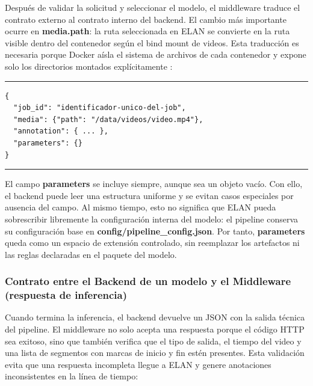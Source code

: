 \documentclass[11pt,a4paper]{article}
\begin{document}
Después de validar la solicitud y seleccionar el modelo, el middleware traduce el contrato externo al contrato interno del backend. El cambio más importante ocurre en \textbf{media.path}: la ruta seleccionada en ELAN se convierte en la ruta visible dentro del contenedor según el bind mount de videos. Esta traducción es necesaria porque Docker aísla el sistema de archivos de cada contenedor y expone solo los directorios montados explícitamente \cite{docker2026overview}:

\begin{center}
\begin{minipage}{0.70\textwidth}
\hrule
\vspace{0.12cm}
\footnotesize
\begin{Verbatim}[baselinestretch=0.78]
{
  "job_id": "identificador-unico-del-job",
  "media": {"path": "/data/videos/video.mp4"},
  "annotation": { ... },
  "parameters": {}
}
\end{Verbatim}
\vspace{0.05cm}
\hrule

\label{lst:payload_middleware_backend}
\end{minipage}
\end{center}

El campo \textbf{parameters} se incluye siempre, aunque sea un objeto vacío. Con ello, el backend puede leer una estructura uniforme y se evitan casos especiales por ausencia del campo. Al mismo tiempo, esto no significa que ELAN pueda sobrescribir libremente la configuración interna del modelo: el pipeline conserva su configuración base en \textbf{config/pipeline\_config.json}. Por tanto, \textbf{parameters} queda como un espacio de extensión controlado, sin reemplazar los artefactos ni las reglas declaradas en el paquete del modelo.

\subsubsection{Contrato entre el Backend de un modelo y el Middleware (respuesta de inferencia)}

Cuando termina la inferencia, el backend devuelve un JSON con la salida técnica del pipeline. El middleware no solo acepta una respuesta porque el código HTTP sea exitoso, sino que también verifica que el tipo de salida, el tiempo del video y una lista de segmentos con marcas de inicio y fin estén presentes. Esta validación evita que una respuesta incompleta llegue a ELAN y genere anotaciones inconsistentes en la línea de tiempo:
\end{document}
